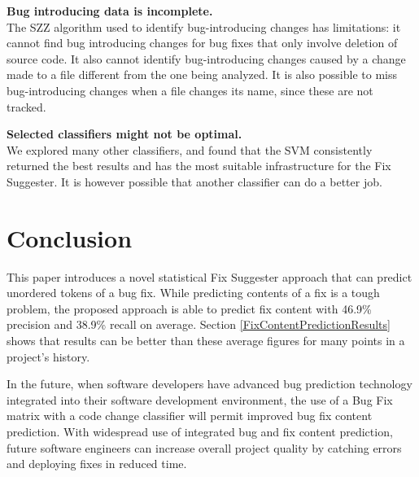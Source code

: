 \documentclass[journal,10pt,draftclsnofoot,twocolumn]{IEEEtran}
\begin{document}
\par \textbf{Bug introducing data is incomplete.} \\ The SZZ algorithm used to identify bug-introducing
changes has limitations: it cannot find bug introducing changes for bug fixes that only involve deletion of source code.
It also cannot identify bug-introducing changes caused by a change made to a file different from the one being analyzed. It is also possible to miss bug-introducing changes when a file changes its name, since these are not tracked.

\par \textbf{Selected classifiers might not be optimal.} \\ We explored many
other classifiers, and found that the SVM consistently returned the
best results and has the most suitable infrastructure for the Fix Suggester. It is however possible that another classifier can do a better job.

\section{Conclusion}
\par This paper introduces a novel statistical Fix Suggester approach that can predict unordered tokens of a bug fix. While predicting contents of a fix is a tough problem, the proposed approach is able to predict fix content with 46.9\% precision and 38.9\% recall on average. Section \ref{FixContentPredictionResults} shows that results can be better than these average figures for many points in a project's history.

\par In the future, when software developers have advanced bug prediction technology
integrated into their software development environment, the use of a Bug Fix matrix with a code change classifier will permit improved bug fix content prediction. With
widespread use of integrated bug and fix content prediction, future software engineers can
increase overall project quality by catching errors and deploying fixes in reduced time.





 
\end{document}
